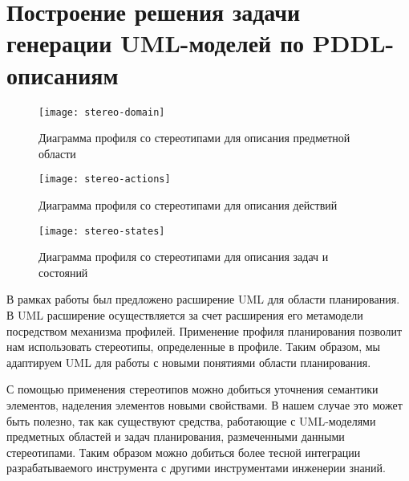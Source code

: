 \chapter{Построение решения задачи генерации UML-моделей по PDDL-описаниям}
   
\begin{figure}[h]
    \centering
    \begin{minipage}{0.8\linewidth}
        \centering
        \texttt{[image: stereo-domain]}
        \caption{Диаграмма профиля со стереотипами для описания предметной области}
        \label{img:stereo-domain}
    \end{minipage}
\end{figure}

\begin{figure}[h]
    \centering
    \begin{minipage}{0.8\linewidth}
        \centering
        \texttt{[image: stereo-actions]}
        \caption{Диаграмма профиля со стереотипами для описания действий}
        \label{img:stereo-actions}
    \end{minipage}
\end{figure}

\begin{figure}[h]
    \centering
    \begin{minipage}{0.75\linewidth}
        \centering
        \texttt{[image: stereo-states]}
        \caption{Диаграмма профиля со стереотипами для описания задач и состояний}
        \label{img:stereo-states}
    \end{minipage}
\end{figure} 

В рамках работы \cite{mal-manz}  был предложено расширение UML для области планирования. В UML расширение осуществляется за счет расширения его метамодели посредством механизма профилей. Применение профиля планирования позволит нам использовать стереотипы, определенные в профиле. Таким образом, мы адаптируем UML для работы с новыми понятиями области планирования. 

С помощью применения стереотипов можно добиться уточнения семантики элементов, наделения элементов новыми свойствами. В нашем случае это может быть полезно, так как существуют средства, работающие с UML-моделями предметных областей и задач планирования, размеченными данными стереотипами. Таким образом можно добиться более тесной интеграции разрабатываемого инструмента с другими инструментами инженерии знаний.


